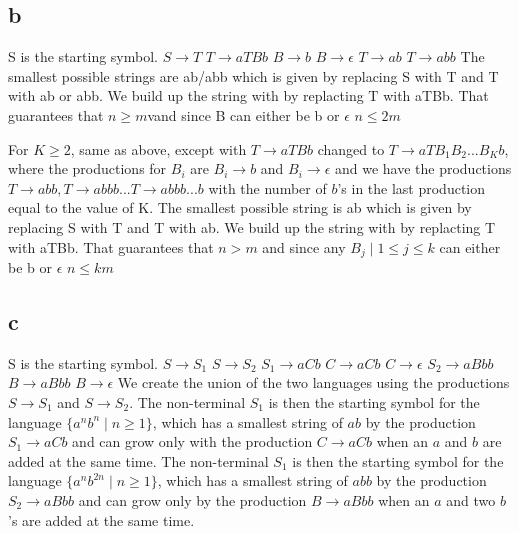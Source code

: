 \documentclass[12pt]{article}
\begin{document}
\subsection*{b} S is the starting symbol. \newline
$S \rightarrow T$ \newline
$T \rightarrow aTBb$ \newline
$B \rightarrow b$ \newline
$B \rightarrow \epsilon$ \newline
$T \rightarrow ab$ \newline
$T \rightarrow abb$ \newline
The smallest possible strings are ab/abb which is given by replacing S with T and T with ab or abb. We build up the string with by replacting T with aTBb. That guarantees that $n \ge m$vand since B can either be b or $\epsilon$ $n \le 2m$\newline

For $K \ge 2$, same as above, except with $T \rightarrow aTBb$ changed to $T \rightarrow aTB_1B_2...B_Kb$, where the productions for $B_i$ are $B_i \rightarrow b$ and $B_i \rightarrow \epsilon$ and we have the productions $T \rightarrow abb, T \rightarrow abbb ... T \rightarrow abbb...b$ with the number of $b$'s in the last production equal to the value of K. \newline
The smallest possible string is ab which is given by replacing S with T and T with ab. We build up the string with by replacting T with aTBb.  That guarantees that $n > m$ and since any $B_j \mid 1 \le j \le k$ can either be b or $\epsilon$ $n \le km$

\subsection*{c} S is the starting symbol. \newline
$S \rightarrow S_1$ \newline
$S \rightarrow S_2$ \newline
$S_1 \rightarrow aCb$ \newline
$C \rightarrow aCb$ \newline
$C \rightarrow \epsilon $ \newline
$S_2 \rightarrow aBbb$ \newline
$B \rightarrow aBbb$ \newline
$B \rightarrow \epsilon $ \newline
We create the union of the two languages using the productions $S \rightarrow S_1$ and
$S \rightarrow S_2$. The non-terminal $S_1$ is then the starting symbol for the language $\{a^{n}b^{n}\mid n \geq 1\}$, which has a smallest string of $ab$ by the production $S_1 \rightarrow aCb$ and can grow only with the production $C \rightarrow aCb$ when an $a$ and $b$ are added at the same time. The non-terminal $S_1$ is then the starting symbol for the language $\{a^{n}b^{2n}\mid n \geq 1\}$, which has a smallest string of $abb$ by the production $S_2 \rightarrow aBbb$ and can grow only by the production $B \rightarrow aBbb$ when an $a$ and two $b$'s are added at the same time.
\end{document}
